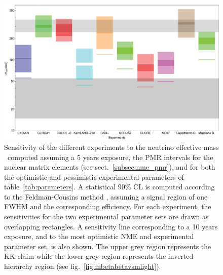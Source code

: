 \begin{figure}[ht]
\includegraphics[width=\textwidth]{img/DB_parameters.eps}
\caption{Sensitivity of the different experiments to the neutrino effective mass \mbb\ computed assuming a 5 years exposure, the PMR intervals for the nuclear matrix elements (see sect.~\ref{subsec:nme_pmr}), and for both the optimistic and pessimistic experimental parameters of table~\ref{tab:parameters}. A statistical 90\% CL is computed according to the Feldman-Cousins method \cite{Feldman:1997qc}, assuming a signal region of one FWHM and the corresponding efficiency. For each experiment, the sensitivities for the two experimental parameter sets are drawn as overlapping rectangles. A sensitivity line corresponding to a 10 years exposure, and to the most optimistic NME and experimental parameter set, is also shown. The upper grey region represents the KK claim \cite{Klapdor-Kleingrothaus:2006zcr} while the lower grey region represents the inverted hierarchy region (see fig.~\ref{fig:mbetabetavsmlight}).}
\label{fig:sens-pmr}
\end{figure}


